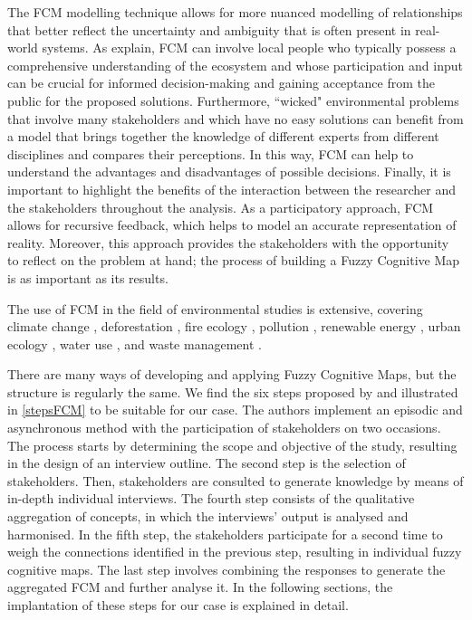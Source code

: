The FCM modelling technique allows for more nuanced modelling of relationships that better reflect the uncertainty and ambiguity that is often present in real-world systems. As \cite{ozesmi2004ecological} explain, FCM can involve local people who typically possess a comprehensive understanding of the ecosystem and whose participation and input can be crucial for informed decision-making and gaining acceptance from the public for the proposed solutions. Furthermore, ``wicked" environmental problems that involve many stakeholders and which have no easy solutions can benefit from a model that brings together the knowledge of different experts from different disciplines and compares their perceptions. In this way, FCM can help to understand the advantages and disadvantages of possible decisions. Finally, it is important to highlight the benefits of the interaction between the researcher and the stakeholders throughout the analysis. As a participatory approach, FCM allows for recursive feedback, which helps to model an accurate representation of reality. Moreover, this approach provides the stakeholders with the opportunity to reflect on the problem at hand; the process of building a Fuzzy Cognitive Map is as important as its results. 

The use of FCM in the field of environmental studies is extensive, covering climate change \citep{kontogianni2012you, singh2014livelihood, reckien2014weather}, deforestation \citep{kok2009potential}, fire ecology \citep{devisscher2016anticipating, eriksson2022using}, pollution \citep{anezakis2016fuzzy, salberg2022assessing, ozesmi2003participatory}, renewable energy \citep{jetter2011building, alipour2019characteristics, kyriakarakos2014fuzzy}, urban ecology \citep{assunccao2020rethinking, olazabal2016use}, water use \citep{giordano2005fuzzy, kafetzis2010using}, and waste management \citep{falcone2020use, morone2021using, kokkinos2018fuzzy, konti2018exploring}. 

There are many ways of developing and applying Fuzzy Cognitive Maps, but the structure is regularly the same. We find the six steps proposed by \cite{edwards2021building} and  illustrated in \cref{stepsFCM} to be suitable for our case. The authors implement an episodic and asynchronous method with the participation of stakeholders on two occasions. The process starts by determining the scope and objective of the study, resulting in the design of an interview outline. The second step is the selection of stakeholders. Then, stakeholders are consulted to generate knowledge by means of in-depth individual interviews. The fourth step consists of the qualitative aggregation of concepts, in which the interviews' output is analysed and harmonised. In the fifth step, the stakeholders participate for a second time to weigh the connections identified in the previous step, resulting in individual fuzzy cognitive maps. The last step involves combining the responses to generate the aggregated FCM and further analyse it. In the following sections, the implantation of these steps for our case is explained in detail.

